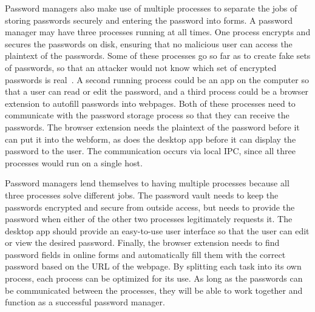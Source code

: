 Password managers also make use of multiple processes to separate the jobs of storing passwords securely and entering the password into forms.  A password manager may have three processes running at all times.  One process encrypts and secures the passwords on disk, ensuring that no malicious user can access the plaintext of the passwords.  Some of these processes go so far as to create fake sets of passwords, so that an attacker would not know which set of encrypted passwords is real~\cite{bojinov2010kamouflage}.  A second running process could be an app on the computer so that a user can read or edit the password, and a third process could be a browser extension to autofill passwords into webpages.  Both of these processes need to communicate with the password storage process so that they can receive the passwords.  The browser extension needs the plaintext of the password before it can put it into the webform, as does the desktop app before it can display the password to the user.  The communication occurs via local IPC, since all three processes would run on a single host.

Password managers lend themselves to having multiple processes because all three processes solve different jobs.  The password vault needs to keep the passwords encrypted and secure from outside access, but needs to provide the password when either of the other two processes legitimately requests it.  The desktop app should provide an easy-to-use user interface so that the user can edit or view the desired password.  Finally, the browser extension needs to find password fields in online forms and automatically fill them with the correct password based on the URL of the webpage.  By splitting each task into its own process, each process can be optimized for its use.  As long as the passwords can be communicated between the processes, they will be able to work together and function as a successful password manager.

